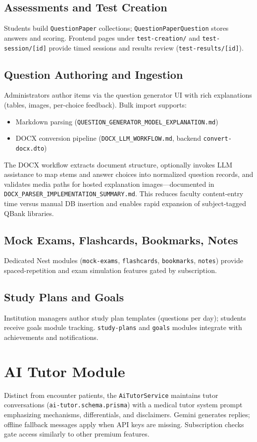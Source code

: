\subsection{Assessments and Test Creation}
Students build \texttt{QuestionPaper} collections; \texttt{QuestionPaperQuestion} stores answers and scoring. Frontend pages under \texttt{test-creation/} and \texttt{test-session/[id]} provide timed sessions and results review (\texttt{test-results/[id]}).

\subsection{Question Authoring and Ingestion}
Administrators author items via the question generator UI with rich explanations (tables, images, per-choice feedback). Bulk import supports:
\begin{itemize}
  \item Markdown parsing (\texttt{QUESTION\_GENERATOR\_MODEL\_EXPLANATION.md})
  \item DOCX conversion pipeline (\texttt{DOCX\_LLM\_WORKFLOW.md}, backend \texttt{convert-docx.dto})
\end{itemize}
The DOCX workflow extracts document structure, optionally invokes LLM assistance to map stems and answer choices into normalized question records, and validates media paths for hosted explanation images---documented in \texttt{DOCX\_PARSER\_IMPLEMENTATION\_SUMMARY.md}. This reduces faculty content-entry time versus manual DB insertion and enables rapid expansion of subject-tagged QBank libraries.

\subsection{Mock Exams, Flashcards, Bookmarks, Notes}
Dedicated Nest modules (\texttt{mock-exams}, \texttt{flashcards}, \texttt{bookmarks}, \texttt{notes}) provide spaced-repetition and exam simulation features gated by subscription.

\subsection{Study Plans and Goals}
Institution managers author study plan templates (questions per day); students receive goals module tracking. \texttt{study-plans} and \texttt{goals} modules integrate with achievements and notifications.

\section{AI Tutor Module}
Distinct from encounter patients, the \texttt{AiTutorService} maintains tutor conversations (\texttt{ai-tutor.schema.prisma}) with a medical tutor system prompt emphasizing mechanisms, differentials, and disclaimers. Gemini generates replies; offline fallback messages apply when API keys are missing. Subscription checks gate access similarly to other premium features.

